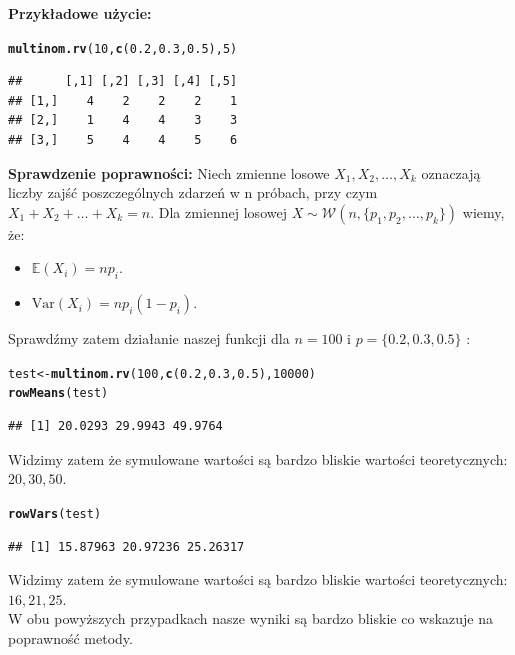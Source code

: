 \documentclass[12pt]{mwart}\usepackage[]{graphicx}\usepackage[]{color}
\makeatletter
\newcommand{\hlnum}[1]{\textcolor[rgb]{0.686,0.059,0.569}{#1}}%
\newcommand{\hlstd}[1]{\textcolor[rgb]{0.345,0.345,0.345}{#1}}%
\newcommand{\hlkwb}[1]{\textcolor[rgb]{0.69,0.353,0.396}{#1}}%
\newcommand{\hlkwd}[1]{\textcolor[rgb]{0.737,0.353,0.396}{\textbf{#1}}}%
\newenvironment{kframe}{%
 \def\at@end@of@kframe{}%
 \ifinner\ifhmode%
  \def\at@end@of@kframe{\end{minipage}}%
  \begin{minipage}{\columnwidth}%
 \fi\fi%
 \def\FrameCommand##1{\hskip\@totalleftmargin \hskip-\fboxsep
 \colorbox{shadecolor}{##1}\hskip-\fboxsep
     \hskip-\linewidth \hskip-\@totalleftmargin \hskip\columnwidth}%
 \MakeFramed {\advance\hsize-\width
   \@totalleftmargin\z@ \linewidth\hsize
   \@setminipage}}%
 {\par\unskip\endMakeFramed%
 \at@end@of@kframe}
\newenvironment{knitrout}{}{} %
\makeatother
\begin{document}
\textbf{Przykładowe użycie:}
\begin{knitrout}
\color{fgcolor}\begin{kframe}
\begin{alltt}
\hlkwd{multinom.rv}\hlstd{(}\hlnum{10}\hlstd{,}\hlkwd{c}\hlstd{(}\hlnum{0.2}\hlstd{,}\hlnum{0.3}\hlstd{,}\hlnum{0.5}\hlstd{),}\hlnum{5}\hlstd{)}
\end{alltt}
\begin{verbatim}
##      [,1] [,2] [,3] [,4] [,5]
## [1,]    4    2    2    2    1
## [2,]    1    4    4    3    3
## [3,]    5    4    4    5    6
\end{verbatim}
\end{kframe}
\end{knitrout}


\textbf{Sprawdzenie poprawności:}\newline
Niech zmienne losowe $X_1,X_2, \dots,X_k $ oznaczają liczby zajść poszczególnych zdarzeń w
n próbach, przy czym $X_1 + X_2 + \dots + X_k  = n$.
Dla zmiennej losowej $X \sim \mathcal{W}(n,\{p_1, p_2, \dots,p_k \})$ wiemy, że:
\begin{itemize}
  \item[] $\mathbb{E}(X_i) = np_i$.
  \item[] $\text{Var}(X_i)= np_i(1-p_i)$.
\end{itemize} 
Sprawdźmy zatem działanie naszej funkcji dla $n = 100$ i $p =\{ 0.2, 0.3, 0.5 \}$ :
\begin{knitrout}
\color{fgcolor}\begin{kframe}
\begin{alltt}
\hlstd{test} \hlkwb{<-} \hlkwd{multinom.rv}\hlstd{(}\hlnum{100}\hlstd{,}\hlkwd{c}\hlstd{(}\hlnum{0.2}\hlstd{,}\hlnum{0.3}\hlstd{,}\hlnum{0.5}\hlstd{),}\hlnum{10000}\hlstd{)}
\hlkwd{rowMeans}\hlstd{(test)}
\end{alltt}
\begin{verbatim}
## [1] 20.0293 29.9943 49.9764
\end{verbatim}
\end{kframe}
\end{knitrout}
Widzimy zatem że symulowane wartości są bardzo bliskie wartości teoretycznych: $20,30,50$.
\begin{knitrout}
\color{fgcolor}\begin{kframe}
\begin{alltt}
\hlkwd{rowVars}\hlstd{(test)}
\end{alltt}
\begin{verbatim}
## [1] 15.87963 20.97236 25.26317
\end{verbatim}
\end{kframe}
\end{knitrout}
Widzimy zatem że symulowane wartości są bardzo bliskie wartości teoretycznych: $16,21,25$.\\
W obu powyższych przypadkach nasze wyniki są bardzo bliskie co wskazuje na poprawność metody.
\newpage
\end{document}
